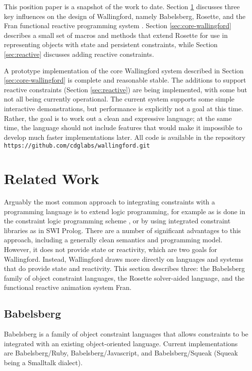 \documentclass{sigplanconf}
\begin{document}
This position paper is a snapshot of the work to date.  Section
\ref{sec:related-work} discusses three key influences on the design of
Wallingford, namely Babelsberg, Rosette, and the Fran
functional reactive programming system
\cite{elliot-icfp-1997}.  Section \ref{sec:core-wallingford} describes a small
set of macros and methods that extend Rosette for use in representing
objects with state and persistent constraints, while Section
\ref{sec:reactive} discusses adding reactive constraints.

A prototype implementation of the core Wallingford system described in
Section \ref{sec:core-wallingford} is complete and reasonable stable.
The additions to support reactive constraints (Section
\ref{sec:reactive}) are being implemented, with some but not all being
currently operational.  The current system supports some simple
interactive demonstrations, but performance is explicitly not a goal
at this time.  Rather, the goal is to work out a clean and expressive
language; at the same time, the language should not include features
that would make it impossible to develop much faster implementations
later.  All code is available in the repository
\verb|https://github.com/cdglabs/wallingford.git|

\section{Related Work}
\label{sec:related-work}

Arguably the most common approach to integrating constraints with a
programming language is to extend logic programming, for example as is
done in the constraint logic programming scheme
\cite{jaffar-popl-1987}, or by using integrated constraint libraries
as in SWI Prolog.  There are a number of significant advantages to
this approach, including a generally clean semantics and programming
model.  However, it does not provide state or reactivity, which are
two goals for Wallingford.  Instead, Wallingford draws more directly
on languages and systems that do provide state and reactivity.  This
section describes three: the Babelsberg family of object constraint
languages, the Rosette solver-aided language, and the functional
reactive animation system Fran.

\subsection{Babelsberg}
\label{sec:babelsberg}

Babelsberg is a family of
object constraint languages that allows constraints to be integrated with
an existing object-oriented language.  Current
implementations are Babelsberg/Ruby, Babelsberg/Javascript, and
Babelsberg/Squeak (Squeak being a Smalltalk dialect).
\end{document}

